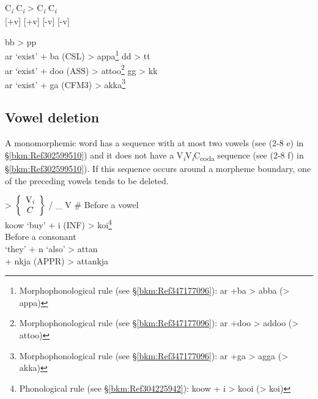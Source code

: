 \begin{exe}
\ex \gll C\textit{\textsubscript{i}}  C\textit{\textsubscript{i}}  >  C\textit{\textsubscript{i}}  C\textit{\textsubscript{i}}\footnotemark\\
 {[+v]}  [+v] {}   [-v]  [-v]\\
\ex
\begin{xlist}
\ex bb > pp\\
    ar   ‘exist’   +   ba   (CSL)   >   appa\footnote{Morphophonological rule (see §\ref{bkm:Ref347177096}): ar +ba > abba (> appa)}
\ex dd > tt\\
    ar   ‘exist’   +   doo   (ASS)   >   attoo\footnote{Morphophonological rule (see §\ref{bkm:Ref347177096}): ar +doo > addoo (> attoo)}
\ex gg > kk\\
    ar   ‘exist’   +   ga   (CFM3)   >   akka\footnote{Morphophonological rule (see §\ref{bkm:Ref347177096}): ar +ga > agga (> akka)}\\
\end{xlist}
\end{exe}

\subsection{Vowel deletion}
\label{bkm:Ref301832441}\hypertarget{RefHeadingToc395696982}{}
A monomorphemic word has a sequence with at most two vowels (see (2-8 e) in §\ref{bkm:Ref302599510}) and it does not have a V\textit{\textsubscript{i}}V\textit{\textsubscript{i}}C\textsubscript{coda} sequence (see (2-8 f) in §\ref{bkm:Ref302599510}). If this sequence occurs around a morpheme boundary, one of the preceding vowels tends to be deleted.

  {>}  $\left\{\begin{array}{c} \text{V\textit{\textsubscript{i}}} \\ C \end{array}  \right\}$  {/}  {\_} V    {\#}
\ex
\ea Before a vowel\\
   {koow}  {‘buy’}  {+}  {i}  {(INF)}  {>}  {koi\footnote{Phonological rule (see §\ref{bkm:Ref304225942}): koow + i > kooi (> koi)}}\\
\ex Before a consonant\\
     {‘they’}  {+}  {n}    {‘also’}   {>}  {attan}\\
        {}         {}      {+}  {nkja}  {(APPR)}  {>}  {attankja}\\
\z
\z

